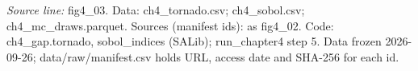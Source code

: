 {\scriptsize\textit{Source line:} fig4\_\allowbreak{}03. Data: ch4\_\allowbreak{}tornado.csv; ch4\_\allowbreak{}sobol.csv; ch4\_\allowbreak{}mc\_\allowbreak{}draws.parquet. Sources (manifest ids): as fig4\_\allowbreak{}02. Code: ch4\_\allowbreak{}gap.tornado, sobol\_\allowbreak{}indices (SALib); run\_\allowbreak{}chapter4 step 5. Data frozen 2026-09-26; data/raw/manifest.csv holds URL, access date and SHA-256 for each id.}